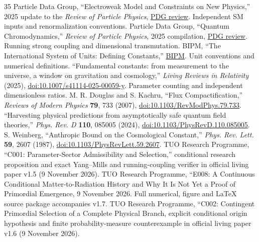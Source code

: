 \documentclass[11pt,a4paper]{article}
\theoremstyle{tmon}
\theoremstyle{definition}
\begin{document}
\begin{thebibliography}{35}
Particle Data Group, ``Electroweak Model and Constraints on New Physics,'' 2025 update to the \emph{Review of Particle Physics}, \href{https://pdg.lbl.gov/2025/reviews/rpp2025-rev-standard-model.pdf}{PDG review}. Independent SM inputs and renormalization conventions.
Particle Data Group, ``Quantum Chromodynamics,'' \emph{Review of Particle Physics}, 2025 compilation, \href{https://pdg.lbl.gov/2025/reviews/rpp2024-rev-qcd.pdf}{PDG review}. Running strong coupling and dimensional transmutation.
BIPM, ``The International System of Units: Defining Constants,'' \href{https://www.bipm.org/en/measurement-units/si-defining-constants}{BIPM}. Unit conventions and numerical definitions.
``Fundamental constants: from measurement to the universe, a window on gravitation and cosmology,'' \emph{Living Reviews in Relativity} (2025), \href{https://doi.org/10.1007/s41114-025-00059-y}{doi:10.1007/s41114-025-00059-y}. Parameter counting and independent dimensionless ratios.
M. R. Douglas and S. Kachru, ``Flux Compactification,'' \emph{Reviews of Modern Physics} \textbf{79}, 733 (2007), \href{https://doi.org/10.1103/RevModPhys.79.733}{doi:10.1103/RevModPhys.79.733}.
``Harvesting physical predictions from asymptotically safe quantum field theories,'' \emph{Phys. Rev. D} \textbf{110}, 085005 (2024), \href{https://doi.org/10.1103/PhysRevD.110.085005}{doi:10.1103/PhysRevD.110.085005}.
S. Weinberg, ``Anthropic Bound on the Cosmological Constant,'' \emph{Phys. Rev. Lett.} \textbf{59}, 2607 (1987), \href{https://doi.org/10.1103/PhysRevLett.59.2607}{doi:10.1103/PhysRevLett.59.2607}.
TUO Research Programme, ``C001: Parameter-Sector Admissibility and Selection,'' conditional research proposition and exact Yang--Mills and running-coupling verifier in official living paper v1.5 (9 November 2026).
 TUO Research Programme, ``E008: A Continuous Conditional Matter-to-Radiation History and Why It Is Not Yet a Proof of Primordial Emergence, 9 November 2026. Full numerical, figure and LaTeX source package accompanies v1.7.
TUO Research Programme, ``C002: Contingent Primordial Selection of a Complete Physical Branch, explicit conditional origin hypothesis and finite probability-measure counterexample in official living paper v1.6 (9 November 2026).


\end{thebibliography}
\end{document}

